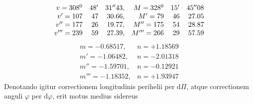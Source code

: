 \[
\begin{array}{rrr@{\quad}rrr}
v=308^0&48'&31''43,&M=328^0&15'&45''08\\
v'=107&47&30.66,&M'=79&46&27.05\\
v''=177&26&19.77,&M''=175&54&28.87\\
v'''=239&59&27.39,&M'''=266&29&57.59
\end{array}
\]
\[
\begin{array}{ll}
m=-0.68517,&n=+1.18569\\
m'=-1.06482,&n=-2.01318\\
m''=-1.59701,&n=-0.12921\\
m'''=-1.18352,&n=+1.93947
\end{array}
\]
Denotando igitur correctionem longitudinis perihelii per $\mathrm d\Pi$, atque correctionem anguli $\varphi$ per $\mathrm d\varphi$, erit motus medius sidereus

